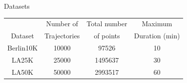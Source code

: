 \begin{frame}{Datasets}
        \centering
        \begin{tabular}{cccc}
            \hline
                    & Number of    & Total number & Maximum        \\
            Dataset & Trajectories & of points    & Duration (min) \\
            \hline
            Berlin10K &  10000 & 97526 & 10\\
            LA25K &  25000 & 1495637 & 30\\
            LA50K &  50000 & 2993517 & 60\\
            \hline
        \end{tabular}
    \end{frame}

%

